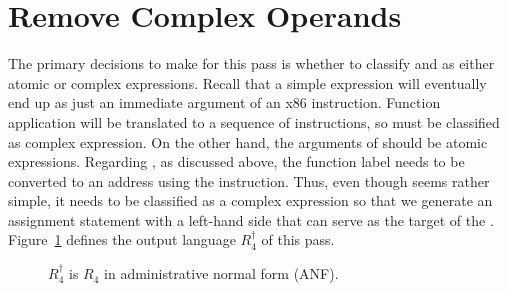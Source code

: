 \documentclass[11pt]{book}
\newcommand{\gray}[1]{{\color{gray} #1}}
\begin{document}
\section{Remove Complex Operands}
\label{sec:rco-r4}

The primary decisions to make for this pass is whether to classify
 and  as either atomic or complex
expressions. Recall that a simple expression will eventually end up as
just an immediate argument of an x86 instruction. Function
application will be translated to a sequence of instructions, so
 must be classified as complex expression.
On the other hand, the arguments of  should be
atomic expressions.
%
Regarding , as discussed above, the function label needs
to be converted to an address using the  instruction. Thus,
even though  seems rather simple, it needs to be
classified as a complex expression so that we generate an assignment
statement with a left-hand side that can serve as the target of the
. Figure~\ref{fig:r4-anf-syntax} defines the
output language $R_4^{\dagger}$ of this pass.

\begin{figure}[tp]
\centering
\fbox{
\begin{minipage}{0.96\textwidth}
\small
\[
\begin{array}{rcl}
  \Atm &::=& \gray{ \INT{\Int} \mid \VAR{\Var} \mid \BOOL{\itm{bool}} 
       \mid \VOID{} } \\
\Exp &::=& \gray{ \Atm \mid \READ{} } \\
   &\mid& \gray{ \NEG{\Atm} \mid \ADD{\Atm}{\Atm} } \\
   &\mid& \gray{ \LET{\Var}{\Exp}{\Exp} } \\
   &\mid& \gray{ \UNIOP{\key{'not}}{\Atm} } \\
   &\mid& \gray{ \BINOP{\itm{cmp}}{\Atm}{\Atm} \mid \IF{\Exp}{\Exp}{\Exp} }\\
   &\mid& \gray{ \LP\key{Collect}~\Int\RP \mid \LP\key{Allocate}~\Int~\Type\RP
  \mid \LP\key{GlobalValue}~\Var\RP }\\
   &\mid& \FUNREF{\Var} \mid \APPLY{\Atm}{\Atm\ldots}\\
 \Def &::=& \gray{ \FUNDEF{\Var}{([\Var \code{:} \Type]\ldots)}{\Type}{\code{'()}}{\Exp} }\\
R^{\dagger}_4  &::=& \gray{ \PROGRAMDEFS{\code{'()}}{\Def} }
\end{array}
\]
\end{minipage}
}
\caption{$R_4^{\dagger}$ is $R_4$ in administrative normal form (ANF).}
\label{fig:r4-anf-syntax}
\end{figure}
\end{document}
